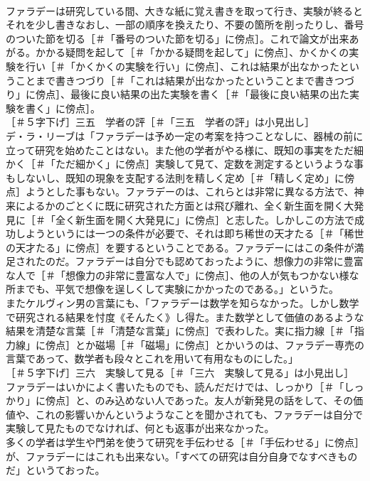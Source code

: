 \documentclass[8pt]{extreport}
\begin{document}
\begin{CJK}{UTF8}{min}
\\	ファラデーは研究している間、大きな紙に覚え書きを取って行き、実験が終るとそれを少し書きなおし、一部の順序を換えたり、不要の箇所を削ったりし、番号のついた節を切る［＃「番号のついた節を切る」に傍点］。これで論文が出来あがる。かかる疑問を起して［＃「かかる疑問を起して」に傍点］、かくかくの実験を行い［＃「かくかくの実験を行い」に傍点］、これは結果が出なかったということまで書きつづり［＃「これは結果が出なかったということまで書きつづり」に傍点］、最後に良い結果の出た実験を書く［＃「最後に良い結果の出た実験を書く」に傍点］。
\\	［＃５字下げ］三五　学者の評［＃「三五　学者の評」は小見出し］
\\	デ・ラ・リーブは「ファラデーは予め一定の考案を持つことなしに、器械の前に立って研究を始めたことはない。また他の学者がやる様に、既知の事実をただ細かく［＃「ただ細かく」に傍点］実験して見て、定数を測定するというような事もしないし、既知の現象を支配する法則を精しく定め［＃「精しく定め」に傍点］ようとした事もない。ファラデーのは、これらとは非常に異なる方法で、神来によるかのごとくに既に研究された方面とは飛び離れ、全く新生面を開く大発見に［＃「全く新生面を開く大発見に」に傍点］と志した。しかしこの方法で成功しようというには一つの条件が必要で、それは即ち稀世の天才たる［＃「稀世の天才たる」に傍点］を要するということである。ファラデーにはこの条件が満足されたのだ。ファラデーは自分でも認めておったように、想像力の非常に豊富な人で［＃「想像力の非常に豊富な人で」に傍点］、他の人が気もつかない様な所までも、平気で想像を逞しくして実験にかかったのである。」というた。
\\	またケルヴィン男の言葉にも、「ファラデーは数学を知らなかった。しかし数学で研究される結果を忖度《そんたく》し得た。また数学として価値のあるような結果を清楚な言葉［＃「清楚な言葉」に傍点］で表わした。実に指力線［＃「指力線」に傍点］とか磁場［＃「磁場」に傍点］とかいうのは、ファラデー専売の言葉であって、数学者も段々とこれを用いて有用なものにした。」
\\	［＃５字下げ］三六　実験して見る［＃「三六　実験して見る」は小見出し］
\\	ファラデーはいかによく書いたものでも、読んだだけでは、しっかり［＃「しっかり」に傍点］と、のみ込めない人であった。友人が新発見の話をして、その価値や、これの影響いかんというようなことを聞かされても、ファラデーは自分で実験して見たものでなければ、何とも返事が出来なかった。
\\	多くの学者は学生や門弟を使うて研究を手伝わせる［＃「手伝わせる」に傍点］が、ファラデーにはこれも出来ない。「すべての研究は自分自身でなすべきものだ」というておった。

\end{CJK}
\end{document}
